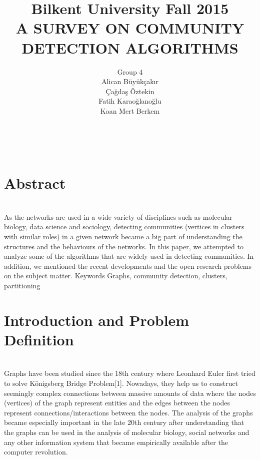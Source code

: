 \documentclass[10pt]{article}
\title{Bilkent University Fall 2015 \\
A SURVEY ON COMMUNITY DETECTION ALGORITHMS}
\author{Group 4 \\
Alican Büyükçakır \\ Çağdaş Öztekin \\ 
Fatih Karaoğlanoğlu \\ 
Kaan Mert Berkem}
\date{\vspace{-5ex}}
\begin{document}
\maketitle


\\

\section*{Abstract} \\

As the networks are used in a wide variety of disciplines such as molecular biology, data science and sociology, detecting communities (vertices in clusters with similar roles) in a given network became a big part of understanding the structures and the behaviours of the networks. In this paper, we attempted to analyze some of the algorithms that are widely used in detecting communities. In addition, we mentioned the recent developments and the open research problems on the subject matter.
Keywords
Graphs, community detection, clusters, partitioning

\newpage

\tableofcontents

\newpage

\section{Introduction and Problem Definition} \\

Graphs have been studied since the 18th century where Leonhard Euler first tried to solve Königsberg Bridge Problem[1]. Nowadays, they help us to construct seemingly complex connections between massive amounts of data where the nodes (vertices) of the graph represent entities and the edges between the nodes represent connections/interactions between the nodes. The analysis of the graphs became especially important in the late 20th century after understanding that the graphs can be used in the analysis of molecular biology, social networks and any other information system that became empirically available after the computer revolution.\\
\end{document}
